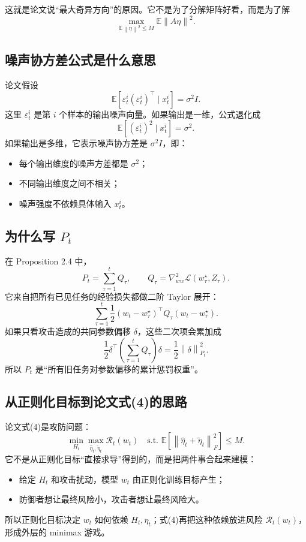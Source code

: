 \documentclass[UTF8,fontset=none,11pt]{ctexart}
\theoremstyle{cnstyle}
\newcommand{\E}{\mathbb{E}}
\newcommand{\calR}{\mathcal{R}}
\newcommand{\calL}{\mathcal{L}}
\newcommand{\norm}[1]{\left\lVert #1\right\rVert}
\begin{document}
这就是论文说“最大奇异方向”的原因。它不是为了分解矩阵好看，而是为了解
\[
  \max_{\E\norm{\eta}^2\le M}\E\norm{A\eta}^2.
\]

\subsection{噪声协方差公式是什么意思}

论文假设
\[
  \E[\varepsilon_t^i(\varepsilon_t^i)^\top\mid x_t^i]=\sigma^2I.
\]
这里 \(\varepsilon_t^i\) 是第 \(i\) 个样本的输出噪声向量。如果输出是一维，公式退化成
\[
  \E[(\varepsilon_t^i)^2\mid x_t^i]=\sigma^2.
\]
如果输出是多维，它表示噪声协方差是 \(\sigma^2I\)，即：
\begin{itemize}
  \item 每个输出维度的噪声方差都是 \(\sigma^2\)；
  \item 不同输出维度之间不相关；
  \item 噪声强度不依赖具体输入 \(x_t^i\)。
\end{itemize}

\subsection{为什么写 \(P_t\)}

在 Proposition 2.4 中，
\[
  P_t=\sum_{\tau=1}^tQ_\tau,
  \qquad
  Q_\tau=\nabla_{ww}^2\calL(w_\tau^\star,Z_\tau).
\]
它来自把所有已见任务的经验损失都做二阶 Taylor 展开：
\[
  \sum_{\tau=1}^t
  \frac12(w_t-w_\tau^\star)^\top Q_\tau(w_t-w_\tau^\star).
\]
如果只看攻击造成的共同参数偏移 \(\delta\)，这些二次项会累加成
\[
  \frac12\delta^\top
  \left(\sum_{\tau=1}^tQ_\tau\right)
  \delta
  =
  \frac12\norm{\delta}_{P_t}^2.
\]
所以 \(P_t\) 是“所有旧任务对参数偏移的累计惩罚权重”。

\subsection{从正则化目标到论文式(4)的思路}

论文式(4)是攻防问题：
\[
  \min_{H_t}\max_{\hat\eta_t,\tilde\eta_t}
  \calR_t(w_t)
  \quad
  \text{s.t. }
  \E[\norm{\hat\eta_t+\tilde\eta_t}_F^2]\le M.
\]
它不是从正则化目标“直接求导”得到的，而是把两件事合起来建模：
\begin{itemize}
  \item 给定 \(H_t\) 和攻击扰动，模型 \(w_t\) 由正则化训练目标产生；
  \item 防御者想让最终风险小，攻击者想让最终风险大。
\end{itemize}
所以正则化目标决定 \(w_t\) 如何依赖 \(H_t,\eta_t\)；式(4)再把这种依赖放进风险 \(\calR_t(w_t)\)，形成外层的 minimax 游戏。
\end{document}
